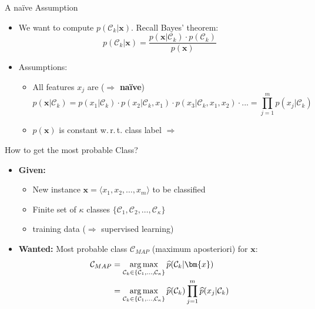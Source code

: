 \begin{frame}{A na\"{i}ve Assumption}{}
	\begin{itemize}
		\item We want to compute $p(\mathcal{C}_k \vert \bm{x})$. Recall Bayes' theorem:
		\begin{equation}
			p(\mathcal{C}_k \vert \bm{x}) = \frac{p(\bm{x} \vert \mathcal{C}_k) \cdot p(\mathcal{C}_k)}{p(\bm{x})}
		\end{equation}
		\item Assumptions:
		\begin{itemize}
			\item All features $x_j$ are 
				($\Rightarrow$ \textbf{na\"{i}ve})
			\begin{equation}
				p(\bm{x} \vert \mathcal{C}_k) 
					= p(x_1 \vert \mathcal{C}_k) \cdot p(x_2 \vert \mathcal{C}_k, x_1) \cdot
						p(x_3 \vert \mathcal{C}_k, x_1, x_2) \cdot ... 
					= \prod_{j=1}^m p(x_j \vert \mathcal{C}_k)
			\end{equation}
			\item $p(\bm{x})$ is constant w.\,r.\,t. class label
				$\Rightarrow$ 
		\end{itemize}
	\end{itemize}
\end{frame}


\begin{frame}{How to get the most probable Class?}{}\important
	\begin{itemize}
		\item \textbf{Given:}
		\begin{itemize}
			\item New instance $\bm{x} = \langle x_1, x_2, \dots, x_m \rangle$ to be classified
			\item Finite set of $\kappa$ classes $\{ \mathcal{C}_1, \mathcal{C}_2, \dots, \mathcal{C}_{\kappa} \}$
			\item {} training data ($\Rightarrow$ supervised learning)
		\end{itemize}
		\item \textbf{Wanted:} Most probable class $\mathcal{C}_{MAP}$ (maximum aposteriori) for $\bm{x}$:
		\begin{align}
			\mathcal{C}_{MAP}
				&= \argmax_{\mathcal{C}_k \in \{ \mathcal{C}_1, \dots, \mathcal{C}_{\kappa} \}} 
					\widehat{p}(\mathcal{C}_k \vert \bm{x}) \\
				&= \argmax_{\mathcal{C}_k \in \{ \mathcal{C}_1, \dots, \mathcal{C}_{\kappa} \}} 
					\widehat{p}(\mathcal{C}_k) \prod_{j=1}^m \widehat{p}(x_j \vert \mathcal{C}_k)
		\end{align}
	\end{itemize}
\end{frame}


